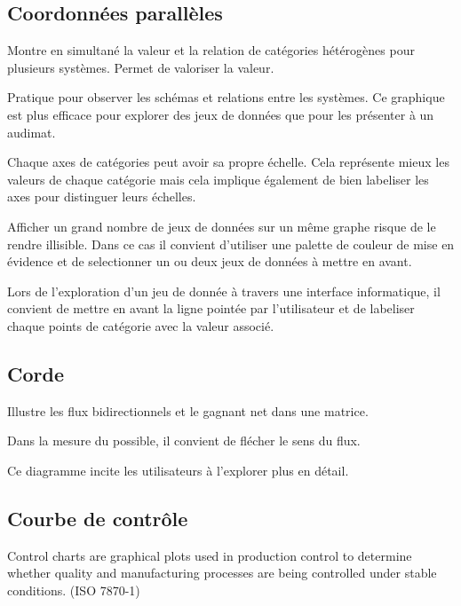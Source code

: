 \documentclass[a4paper,12pt]{article}
\begin{document}
\begin{multicols}{2}
\subsection*{Coordonnées parallèles}
\label{sec:org2e22234}
Montre en simultané la valeur et la relation de catégories hétérogènes pour plusieurs systèmes. \autocite{jonathanschwabishRelationship2021} Permet de valoriser la valeur. \autocite{alansmithLexiqueVisuel}

Pratique pour observer les schémas et relations entre les systèmes. \autocite{mikeyiHowChooseRight2020} Ce graphique est plus efficace pour explorer des jeux de données que pour les présenter à un audimat. \autocite{sosulskiGraphics2019}

Chaque axes de catégories peut avoir sa propre échelle. Cela représente mieux les valeurs de chaque catégorie mais cela implique également de bien labeliser les axes pour distinguer leurs échelles. \autocite{jonathanschwabishRelationship2021}

Afficher un grand nombre de jeux de données sur un même graphe risque de le rendre illisible. \autocite{jonathanschwabishRelationship2021} Dans ce cas il convient d'utiliser une palette de couleur de mise en évidence et de selectionner un ou deux jeux de données à mettre en avant.

Lors de l'exploration d'un jeu de donnée à travers une interface informatique, il convient de mettre en avant la ligne pointée par l'utilisateur et de labeliser chaque points de catégorie avec la valeur associé. \autocite{sosulskiGraphics2019}
\subsection*{Corde}
\label{sec:org44a129b}
Illustre les flux bidirectionnels et le gagnant net dans une matrice. \autocite{alansmithLexiqueVisuel}

Dans la mesure du possible, il convient de flécher le sens du flux.

Ce diagramme incite les utilisateurs à l'explorer plus en détail. \autocite{jonathanschwabishRelationship2021}
\subsection*{Courbe de contrôle}
\label{sec:org2eb4948}

Control charts are graphical plots used in production control to determine whether quality and manufacturing processes are being controlled under stable conditions. (ISO 7870-1)


\end{multicols}
\end{document}

